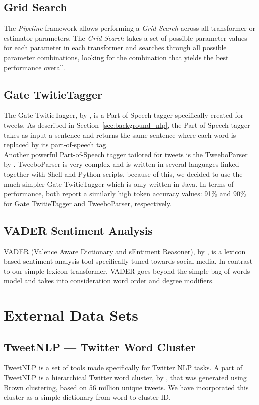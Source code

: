 \subsection*{Grid Search}
The \textit{Pipeline} framework allows performing a \textit{Grid Search} across all transformer or estimator parameters. The \textit{Grid Search} takes a set of possible parameter values for each parameter in each transformer and searches through all possible parameter combinations, looking for the combination that yields the best performance overall.

\subsection{Gate TwitieTagger}
The Gate TwitieTagger, by \cite{twitieTagger}, is a Part-of-Speech tagger specifically created for tweets. As described in Section~\ref{sec:background_nlp}, the Part-of-Speech tagger takes as input a sentence and returns the same sentence where each word is replaced by its part-of-speech tag. \\

Another powerful Part-of-Speech tagger tailored for tweets is the TweeboParser by \cite{Gimpel11}. TweeboParser is very complex and is written in several languages linked together with Shell and Python scripts, because of this, we decided to use the much simpler Gate TwitieTagger which is only written in Java. In terms of performance, both report a similarly high token accuracy values: 91\% and 90\% for Gate TwitieTagger and TweeboParser, respectively.

\subsection{VADER Sentiment Analysis}
\label{sec:vaderSentiment}
VADER (Valence Aware Dictionary and sEntiment Reasoner), by \cite{vaderSentiment}, is a lexicon based sentiment analysis tool specifically tuned towards social media. In contrast to our simple lexicon transformer, VADER goes beyond the simple bag-of-words model and takes into consideration word order and degree modifiers.

\section{External Data Sets}

\subsection{TweetNLP --- Twitter Word Cluster}
\label{sec:tweetnlp}
TweetNLP is a set of tools made specifically for Twitter NLP tasks. A part of TweetNLP is a hierarchical Twitter word cluster, by \cite{Owoputi12}, that was generated using Brown clustering, based on 56 million unique tweets. We have incorporated this cluster as a simple dictionary from word to cluster ID. 


